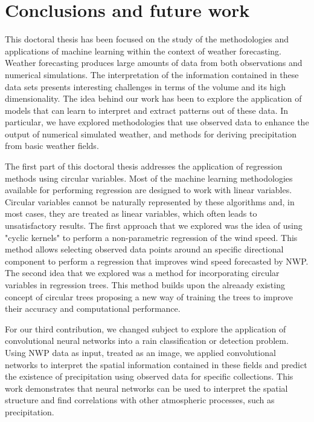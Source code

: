 
\chapter{Conclusions and future work} %

\label{Chapter3}

This doctoral thesis has been focused on the study of the methodologies and applications of machine learning within the context of weather forecasting. Weather forecasting produces large amounts of data from both observations and numerical simulations. The interpretation of the information contained in these data sets presents interesting challenges in terms of the volume and its high dimensionality. The idea behind our work has been to explore the application of models that can learn to interpret and extract patterns out of these data. In particular, we have explored methodologies that use observed data to enhance the output of numerical simulated weather, and methods for deriving precipitation from basic weather fields. 

\medskip

The first part of this doctoral thesis addresses the application of regression methods using circular variables. Most of the machine learning methodologies available for performing regression are designed to work with linear variables. Circular variables cannot be naturally represented by these algorithms and, in most cases, they are treated as linear variables, which often leads to unsatisfactory results. The first approach that we explored was the idea of using "cyclic kernels" to perform a non-parametric regression of the wind speed. This method allows selecting observed data points around an specific directional component to perform a regression that improves wind speed forecasted by NWP. The second idea that we explored was a method for incorporating circular variables in regression trees. This method builds upon the alreaady existing concept of circular trees proposing a new way of training the trees to improve their accuracy and computational performance.

\medskip

For our third contribution, we changed subject to explore the application of convolutional neural networks into a rain classification or detection problem. Using NWP data as input, treated as an image, we applied convolutional networks to interpret the spatial information contained in these fields and predict the existence of precipitation using observed data for specific collections. This work demonstrates that neural networks can be used to interpret the spatial structure and find correlations with other atmospheric processes, such as precipitation.  

